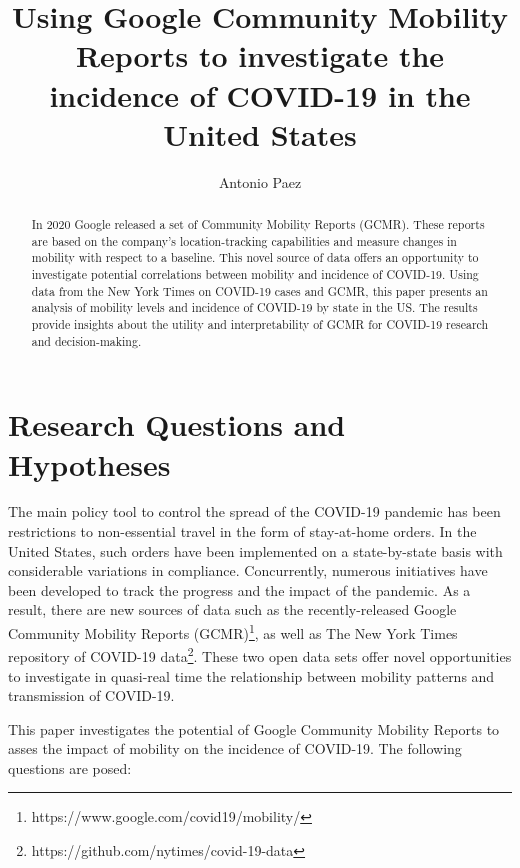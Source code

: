 \documentclass[]{elsarticle} %
\begin{document}
\begin{frontmatter}

  \title{Using Google Community Mobility Reports to investigate the incidence of
COVID-19 in the United States}
    \author[McMaster University]{Antonio Paez}
      \address[McMaster University]{School of Geography and Earth Sciences, McMaster University, Hamilton,
ON, L8S 4K1, Canada}
  
  \begin{abstract}
  In 2020 Google released a set of Community Mobility Reports (GCMR).
  These reports are based on the company's location-tracking capabilities
  and measure changes in mobility with respect to a baseline. This novel
  source of data offers an opportunity to investigate potential
  correlations between mobility and incidence of COVID-19. Using data from
  the New York Times on COVID-19 cases and GCMR, this paper presents an
  analysis of mobility levels and incidence of COVID-19 by state in the
  US. The results provide insights about the utility and interpretability
  of GCMR for COVID-19 research and decision-making.
  \end{abstract}
  
 \end{frontmatter}

\hypertarget{research-questions-and-hypotheses}{%
\section{Research Questions and
Hypotheses}\label{research-questions-and-hypotheses}}

The main policy tool to control the spread of the COVID-19 pandemic has
been restrictions to non-essential travel in the form of stay-at-home
orders. In the United States, such orders have been implemented on a
state-by-state basis with considerable variations in compliance.
Concurrently, numerous initiatives have been developed to track the
progress and the impact of the pandemic. As a result, there are new
sources of data such as the recently-released Google Community Mobility
Reports (GCMR)\footnote{https://www.google.com/covid19/mobility/}, as
well as The New York Times repository of COVID-19
data\footnote{https://github.com/nytimes/covid-19-data}. These two open
data sets offer novel opportunities to investigate in quasi-real time
the relationship between mobility patterns and transmission of COVID-19.

This paper investigates the potential of Google Community Mobility
Reports to asses the impact of mobility on the incidence of COVID-19.
The following questions are posed:
\end{document}
